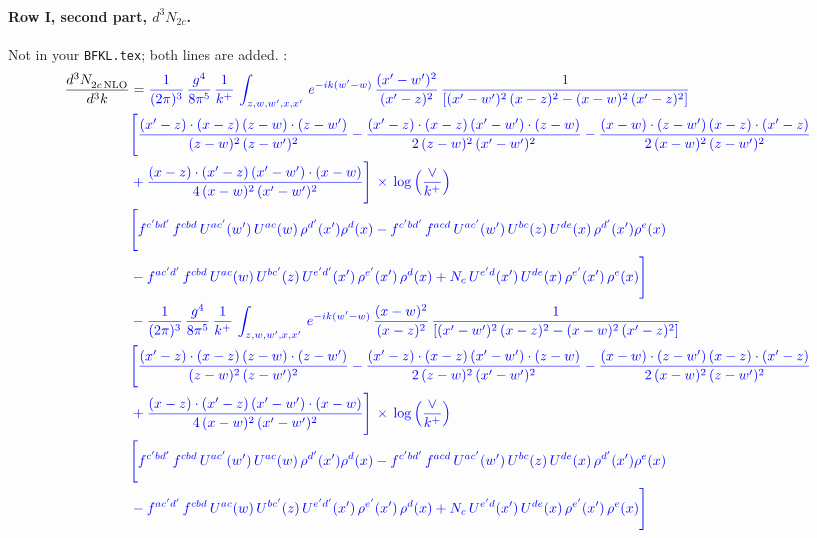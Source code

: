 \documentclass[10pt]{article}
\numberwithin{equation}{section}
\newcommand{\new}[1]{{\color{blue}#1}}
\newcommand{\nc}{\color{blue}}
\begin{document}
\paragraph{Row I, second part, $d^3N_{2c}$.}
Not in your \texttt{BFKL.tex}; both lines are \new{added}.
\noindent \new{From \texttt{Other\_terms.tex}}:
\begin{align}
    \frac{d^{3}N_{2c\,\rm NLO}^{\rm}}{d^{3}k}  & =  \nc \frac{1}{(2\pi)^{3}}\, \frac{g^{4}}{8\pi^{5}}\,\frac{1}{k^{+}}\,\int_{z,w,w^{\prime},x,x'}\, e^{-ik(w^{\prime}-w)}\,\frac{(x'-w')^{2}}{(x'-z)^{2}}\, \frac{1}{\left[(x'-w')^{2}\, (x-z)^{2} - (x-w)^{2}\, (x'-z)^{2}\right]} \notag \\ & \nc  \Bigg[\frac{(x'-z)\cdot (x-z)\, (z-w)\cdot (z-w')}{(z-w)^{2}\, (z-w')^{2}}-\frac{(x'-z)\cdot (x-z)\, (x'-w')\cdot (z-w)}{2\, (z-w)^{2}\, (x'-w')^{2}} -\frac{(x-w)\cdot (z-w')\, (x-z)\cdot (x'-z)}{2\, (x-w)^{2}\, (z-w')^{2}}\notag \\ & \nc  +\frac{(x-z)\cdot (x'-z)\, (x'-w')\cdot (x-w)}{4\, (x-w)^{2}\, (x'-w')^{2}}\Bigg]\,\times\, \new{\log{\left(\frac{\vee}{k^{+}}\right)}} \notag \\ & \nc   \Bigg[f^{c'bd'}\,f^{cbd}\, U^{ac'}(w')\,U^{ac}(w)\,\rho^{d'}(x')\rho^{d}(x)- f^{c'bd'}\,f^{acd}\,U^{ac'}(w')\,U^{bc}(z)\,U^{de}(x)\,\rho^{d'}(x')\rho^{e}(x) \notag \\ & \nc  -f^{ac'd'}\,f^{cbd}\,U^{ac}(w)\,U^{bc'}(z)\,U^{e'd'}(x')\,\rho^{e'}(x')\,\rho^{d}(x) +N_{c}\,U^{e'd}(x')\,U^{de}(x)\,\rho^{e'}(x')\,\rho^{e}(x)\Bigg] \notag \\
& \nc  -\frac{1}{(2\pi)^{3}}\, \frac{g^{4}}{8\pi^{5}}\,\frac{1}{k^{+}}\,\int_{z,w,w^{\prime},x,x'}\, e^{-ik(w^{\prime}-w)}\,\frac{(x-w)^{2}}{(x-z)^{2}}\, \frac{1}{\left[(x'-w')^{2}\, (x-z)^{2} - (x-w)^{2}\, (x'-z)^{2}\right]} \notag \\ & \nc  \Bigg[\frac{(x'-z)\cdot (x-z)\, (z-w)\cdot (z-w')}{(z-w)^{2}\, (z-w')^{2}}-\frac{(x'-z)\cdot (x-z)\, (x'-w')\cdot (z-w)}{2\, (z-w)^{2}\, (x'-w')^{2}} -\frac{(x-w)\cdot (z-w')\, (x-z)\cdot (x'-z)}{2\, (x-w)^{2}\, (z-w')^{2}}\notag \\ & \nc  +\frac{(x-z)\cdot (x'-z)\, (x'-w')\cdot (x-w)}{4\, (x-w)^{2}\, (x'-w')^{2}}\Bigg]\,\times\, \new{\log{\left(\frac{\vee}{k^{+}}\right)}} \notag \\ & \nc   \Bigg[f^{c'bd'}\,f^{cbd}\, U^{ac'}(w')\,U^{ac}(w)\,\rho^{d'}(x')\rho^{d}(x)- f^{c'bd'}\,f^{acd}\,U^{ac'}(w')\,U^{bc}(z)\,U^{de}(x)\,\rho^{d'}(x')\rho^{e}(x) \notag \\ & \nc  -f^{ac'd'}\,f^{cbd}\,U^{ac}(w)\,U^{bc'}(z)\,U^{e'd'}(x')\,\rho^{e'}(x')\,\rho^{d}(x) +N_{c}\,U^{e'd}(x')\,U^{de}(x)\,\rho^{e'}(x')\,\rho^{e}(x)\Bigg] \label{eq:Bnew:G2I2c}
\end{align}
\end{document}
